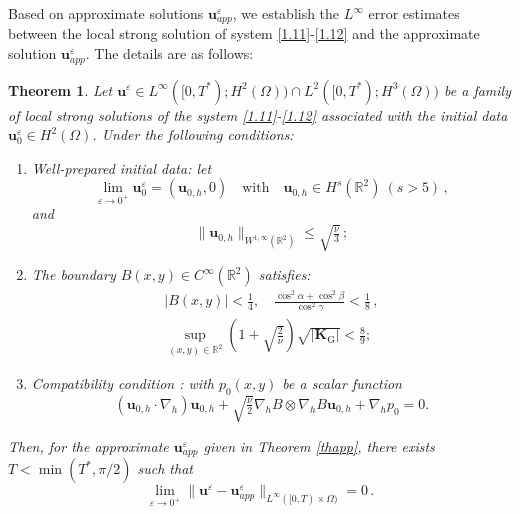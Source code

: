 \documentclass[pdflatex,sn-mathphys-num]{sn-jnl}%
\theoremstyle{thmstyleone}%
\newtheorem{theorem}{Theorem}%
\theoremstyle{thmstyletwo}%
\theoremstyle{thmstylethree}%
\theoremstyle{thmstyletwo}
\begin{document}
   
Based on approximate solutions $\boldsymbol{u}_{app}^\varepsilon$, we establish the $L^\infty$ error estimates between the local strong solution of system \eqref{1.11}-\eqref{1.12} and the approximate solution $\boldsymbol{u}_{app}^\varepsilon$. The details are as follows:
\begin{theorem}\label{thm2}
	Let $\boldsymbol u^\varepsilon\in{L}^{\infty}([0,T^*);{H}^{2} (\Omega))\cap{L}^{2}([0,T^*);{H}^{3} (\Omega))$ be a family of local strong solutions of the system \eqref{1.11}-\eqref{1.12} associated with the initial data $\boldsymbol u_0^\varepsilon\in   H^{2}(\Omega)$. Under the following conditions:
	\begin{enumerate}[1.]
		\item{Well-prepared initial data:} 
		let 
		\begin{equation}\label{1.21}
			\mathop{\lim}\limits_{\varepsilon\rightarrow 0^+} \boldsymbol u^\varepsilon_0=
			({\boldsymbol u}_{0,h}, 0)
			\quad\text{with}\quad{\boldsymbol u}_{0,h}\in H^s(\mathbb{R}^2)~(s>5)\,,
		\end{equation}
		and
		\begin{equation}\label{1.26}   
		\lVert{\boldsymbol{u}}_{0,h}\rVert_{{W}^{1,\infty}(\mathbb{R}^2)}\leq\sqrt{\tfrac{\nu}{3}}\,;
		\end{equation}
		\item{The boundary $B(x,y)\in C^\infty(\mathbb{R}^2)$ satisfies:}
		\begin{align}
			|{B}(x,y)|<\tfrac14,\quad   \tfrac{\cos^2\alpha+\cos^2\beta}{\cos^2\gamma}<\tfrac{1}{8}\,,\label{1.23}\\
			\sup\limits_{(x,y)\in \mathbb{R}^2} (1+\sqrt{\tfrac{2}{\nu}})\sqrt{\big| \boldsymbol{K}_{\mathrm{G}}\big|} <\tfrac{8}{9};\label{1.24}	
		\end{align}
		\item{Compatibility condition : with  $p_0(x,y)$ be a scalar function}
	\begin{equation}\label{compatibility}
		({\boldsymbol{u}}_{0,h}\cdot\nabla_h){\boldsymbol{u}}_{0,h}
			+\sqrt{\tfrac{\nu}{2 }}
			\nabla_{ h}B\otimes\nabla_{ h}B
			{\boldsymbol u}_{0,h}
		 +\nabla_h p_0=0.
	\end{equation} 
	\end{enumerate}
	Then, for the approximate $\boldsymbol{u}_{app}^\varepsilon$ given in Theorem \ref{thapp}, there exists $T<\min(T^*,\pi/2)$ such that
	\begin{equation}\label{1.25} \lim\limits_{\varepsilon\rightarrow0^+}
		\lVert
		\boldsymbol{u}^\varepsilon
		-\boldsymbol{u}_{app}^\varepsilon 
		\rVert_{{L}^{\infty}([0,T)\times\Omega)}=0\,.
	\end{equation}	
\end{theorem}
\end{document}
